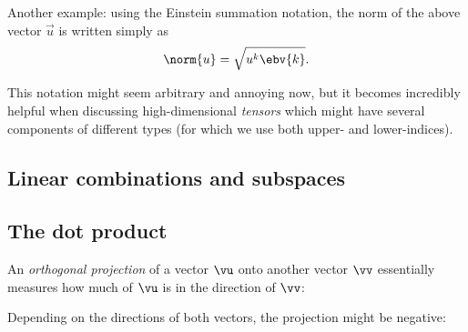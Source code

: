 Another example: using the Einstein summation notation, the norm of the above vector $\vec{u}$ is written simply as
\begin{equation}
  \norm{u} = \sqrt{u^{k}\ebv{k}}.
  \label{eq:Einstein_notation_norm_Rn}
\end{equation}

This notation might seem arbitrary and annoying now, but it becomes incredibly helpful when discussing high-dimensional \emph{tensors} which might have several components of different types (for which we use both upper- and lower-indices).


\subsection{Linear combinations and subspaces}

\subsection{The dot product}

An \emph{orthogonal projection} of a vector $\vu$ onto another vector $\vv$ essentially measures how much of $\vu$ is in the direction of $\vv$:

\vspace{1em}
\begin{center}
\end{center}

Depending on the directions of both vectors, the projection might be negative:

